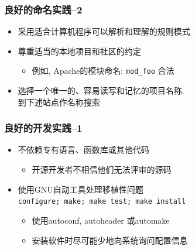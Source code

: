 \documentclass[compress]{beamer}
\begin{document}
\begin{frame}[fragile]
\frametitle{良好的命名实践--2}

\begin{itemize}
  \item 采用适合计算机程序可以解析和理解的规则模式
\item 尊重适当的本地项目和社区的约定
    \begin{itemize}
    \item 例如, Apache的模块命名: \verb~mod_foo~ 合法
    \end{itemize}
\item 选择一个唯一的、容易读写和记忆的项目名称.\\
到下述站点作名称搜索

\end{itemize}

\end{frame}

\begin{frame}[fragile]
\frametitle{良好的开发实践--1}
\begin{itemize}
\item 不依赖专有语言、函数库或其他代码
    \begin{itemize}
    \item 开源开发者不相信他们无法评审的源码
    \end{itemize}
\item 使用GNU自动工具处理移植性问题\\
\verb~configure; make; make test; make install~
    \begin{itemize}
    \item 使用\alert{autoconf}, \alert{autoheader} 或\alert{automake}
    \item 安装软件时尽可能少地向系统询问配置信息
    \end{itemize}
\end{itemize}


\end{frame}
\end{document}
